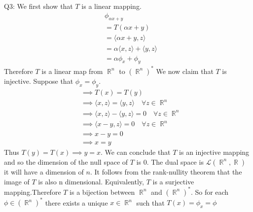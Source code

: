 \documentclass[letterpaper]{article}
\DeclareMathOperator{\R}{\mathbb{R}}
\newcommand{\lan}{\langle}
\newcommand{\ran}{\rangle}
\newcommand{\inn}[1]{\lan#1\ran}
\begin{document}
Q3:\newline
We first show that $T$ is a linear mapping. 
\begin{align*}
    & \phi_{\alpha x +y}
    \\ & = T(\alpha x +y)
    \\ & = \inn{\alpha x + y,z}
    \\ & = \alpha \inn{x,z} + \inn{y,z}
    \\ & = \alpha \phi_x + \phi_y
\end{align*}
Therefore $T$ is a linear map from $\R^n$ to $(\R^n)^*$\newline
We now claim that $T$ is injective. Suppose that $\phi_x = \phi_y$. 
\begin{align*}
    & \implies T(x)= T(y)
    \\ & \implies  \inn{x,z} = \inn{y,z} \quad \forall z \in \R^n
    \\ & \implies \inn{x,z} -\inn{y,z} = 0 \quad \forall z \in \R^n
    \\ & \implies \inn{x-y,z} = 0 \quad \forall z\in \R^n
    \\ & \implies   x-y=0
    \\ & \implies   x=y
\end{align*}
Thus $T(y)=T(x) \implies y=x$. We can conclude that $T$ is an injective mapping and so the dimension of the null space of $T$ is 0. The dual space is $\mathcal{L} (\R^n, \R)$ it will have a dimension of $n$. It follows from the rank-nullity theorem
that the image of $T$ is also n dimensional. Equivalently, $T$ is a surjective mapping.Therefore $T$ is a bijection between $\R^n$ and $(\R^n)^*$. So for each $\phi \in (\R^n)^*$ there exists a unique $x\in\R^n$ such that $T(x) = \phi_x = \phi$
\end{document}
